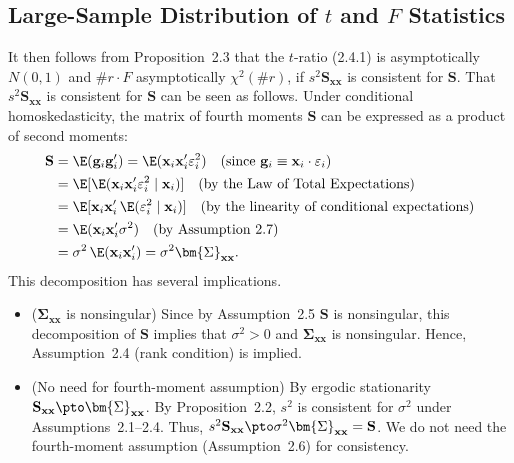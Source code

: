 \subsection*{Large-Sample Distribution of $t$ and $F$ Statistics}

It then follows from Proposition~2.3 that the $t$-ratio (2.4.1) is asymptotically
$N(0,1)$ and $\#r \cdot F$ asymptotically $\chi^2(\#r)$, if
$s^2 \mathbf{S}_{\mathbf{xx}}$ is consistent for $\mathbf{S}$.  That
$s^2 \mathbf{S}_{\mathbf{xx}}$ is consistent for $\mathbf{S}$ can be seen as follows.
Under conditional homoskedasticity, the matrix of fourth moments $\mathbf{S}$ can be
expressed as a product of second moments:
\begin{align}
  \mathbf{S} &= \E(\mathbf{g}_i \mathbf{g}_i')
    = \E(\mathbf{x}_i \mathbf{x}_i' \varepsilon_i^2)
    \quad (\text{since } \mathbf{g}_i \equiv \mathbf{x}_i \cdot \varepsilon_i) \notag \\
    &= \E[\E(\mathbf{x}_i \mathbf{x}_i' \varepsilon_i^2 \mid \mathbf{x}_i)]
    \quad (\text{by the Law of Total Expectations}) \notag \\
    &= \E[\mathbf{x}_i \mathbf{x}_i' \,\E(\varepsilon_i^2 \mid \mathbf{x}_i)]
    \quad (\text{by the linearity of conditional expectations}) \notag \\
    &= \E(\mathbf{x}_i \mathbf{x}_i' \sigma^2)
    \quad (\text{by Assumption~2.7}) \notag \\
    &= \sigma^2 \,\E(\mathbf{x}_i \mathbf{x}_i')
    = \sigma^2 \bm{\Sigma}_{\mathbf{xx}}.
  \label{eq:2.6.4}
\end{align}
This decomposition has several implications.
\begin{itemize}
  \item ($\bm{\Sigma}_{\mathbf{xx}}$ is nonsingular) \;
    Since by Assumption~2.5 $\mathbf{S}$ is nonsingular, this decomposition of
    $\mathbf{S}$ implies that $\sigma^2 > 0$ and $\bm{\Sigma}_{\mathbf{xx}}$ is
    nonsingular.  Hence, Assumption~2.4 (rank condition) is implied.

  \item (No need for fourth-moment assumption) \;
    By ergodic stationarity $\mathbf{S}_{\mathbf{xx}} \pto \bm{\Sigma}_{\mathbf{xx}}$.
    By Proposition~2.2, $s^2$ is consistent for $\sigma^2$ under Assumptions~2.1--2.4.
    Thus, $s^2 \mathbf{S}_{\mathbf{xx}} \pto \sigma^2 \bm{\Sigma}_{\mathbf{xx}}
    = \mathbf{S}$.  We do not need the fourth-moment assumption (Assumption~2.6) for
    consistency.
\end{itemize}

